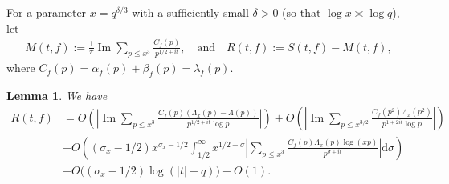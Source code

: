 \documentclass[11pt,reqno]{amsart}
\newcommand{\bna}{\begin{eqnarray*}}
\newcommand{\ena}{\end{eqnarray*}}
\numberwithin{equation}{section}
\theoremstyle{plain}
\newtheorem{lemma}{Lemma}[section]
\theoremstyle{definition}
\renewcommand{\Im}{\operatorname{Im}}
\begin{document}
For a parameter $x = q^{\delta/3}$ with a sufficiently small $\delta > 0$ (so that $\log x \asymp \log q$), let
\bna
M(t,f):=\frac{1}{\pi}\Im\sum_{p\leq x^3}\frac{C_f(p)}{p^{1/2+it}},\quad
\text{and}\quad
R(t,f):=S(t,f)-M(t,f),
\ena
where $C_f(p)=\alpha_f(p)+\beta_f(p)=\lambda_f(p)$.
\begin{lemma}\label{lemma 5} We have
\begin{equation*}
\begin{split}
R(t,f)&=O\left(\left|\Im\sum_{p\leq x^3}
\frac{C_f(p)(\Lambda_x(p)-\Lambda(p))}{p^{1/2+it}\log p}\right|\right)
+O\left(\left|\Im\sum_{p\leq x^{3/2}}\frac{C_f(p^2)\Lambda_x(p^2)}{p^{1+2it}\log p}\right|\right)\\
&+O\left((\sigma_x-1/2)x^{\sigma_x-1/2}\int_{1/2}^\infty
x^{1/2-\sigma}\left|\sum_{p\leq x^3}
\frac{C_f(p)\Lambda_x(p)\log(xp)}{p^{\sigma+it}}\right|\mathrm{d}\sigma\right)\\
&+O\big((\sigma_x-1/2)\log(|t|+q)\big)+O(1).
\end{split}
\end{equation*}
\end{lemma}
\end{document}
